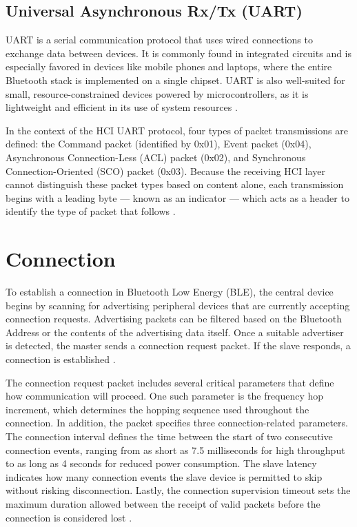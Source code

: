 \subsection{Universal Asynchronous Rx/Tx (UART)}

UART is a serial communication protocol that uses wired connections to exchange data between devices. It is commonly found in integrated circuits and is especially favored in devices like mobile phones and laptops, where the entire Bluetooth stack is implemented on a single chipset. UART is also well-suited for small, resource-constrained devices powered by microcontrollers, as it is lightweight and efficient in its use of system resources \cite{nextgenBLE}.

In the context of the HCI UART protocol, four types of packet transmissions are defined: the Command packet (identified by 0x01), Event packet (0x04), Asynchronous Connection-Less (ACL) packet (0x02), and Synchronous Connection-Oriented (SCO) packet (0x03). Because the receiving HCI layer cannot distinguish these packet types based on content alone, each transmission begins with a leading byte — known as an indicator — which acts as a header to identify the type of packet that follows \cite{nextgenBLE}.

\section{Connection}

To establish a connection in Bluetooth Low Energy (BLE), the central device begins by scanning for advertising peripheral devices that are currently accepting connection requests. Advertising packets can be filtered based on the Bluetooth Address or the contents of the advertising data itself. Once a suitable advertiser is detected, the master sends a connection request packet. If the slave responds, a connection is established \cite{gettingstartedwble}.

The connection request packet includes several critical parameters that define how communication will proceed. One such parameter is the frequency hop increment, which determines the hopping sequence used throughout the connection. In addition, the packet specifies three connection-related parameters. The connection interval defines the time between the start of two consecutive connection events, ranging from as short as 7.5 milliseconds for high throughput to as long as 4 seconds for reduced power consumption. The slave latency indicates how many connection events the slave device is permitted to skip without risking disconnection. Lastly, the connection supervision timeout sets the maximum duration allowed between the receipt of valid packets before the connection is considered lost \cite{gettingstartedwble}.

